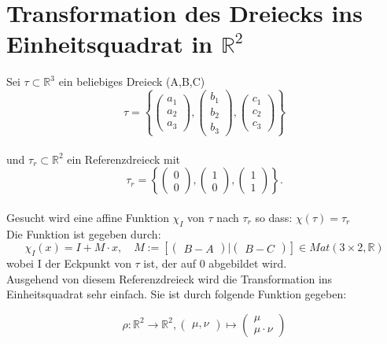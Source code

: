 \documentclass[12pt]{article}
\begin{document}
\section{Transformation des Dreiecks ins \\ Einheitsquadrat in $\mathbb{R}^2$}
Sei $\tau\subset \mathbb{R}^3$ ein beliebiges Dreieck (A,B,C)
\[
\tau = \left \{
\begin{pmatrix} a_1\\ a_2 \\ a_3 \end{pmatrix}
,
\begin{pmatrix} b_1\\ b_2 \\ b_3 \end{pmatrix}
,
\begin{pmatrix} c_1\\ c_2 \\ c_3 \end{pmatrix}
\right \}
\]
\\
und $\tau_r \subset \mathbb{R}^2$ ein Referenzdreieck mit
\[
 \tau_r = \left \{
\begin{pmatrix} 0\\ 0 \end{pmatrix}
,
\begin{pmatrix} 1\\ 0\end{pmatrix}
,
\begin{pmatrix} 1\\ 1\end{pmatrix}
\right \} .
\]
\\
Gesucht wird eine affine Funktion $\chi_I$ von $\tau$ nach $\tau_r$ so dass: $\chi(\tau) = \tau_r$
\\
Die Funktion ist gegeben durch:
\[
\chi_I(x) = I + M\cdot x, \quad M := \left[
\begin{pmatrix} B-A \end{pmatrix}
|
\begin{pmatrix} B-C \end{pmatrix}
\right]
 \in Mat(3\times 2,\mathbb{R})
\]
wobei I der Eckpunkt von $\tau$ ist, der auf 0 abgebildet wird.
\\
Ausgehend von diesem Referenzdreieck wird die Transformation ins Einheitsquadrat sehr einfach. Sie ist durch folgende Funktion gegeben:

\[
	\rho : \mathbb{R}^2 \rightarrow \mathbb{R}^2, \begin{pmatrix} \mu,\nu \end{pmatrix} \mapsto \begin{pmatrix} \mu\\\mu\cdot\nu \end{pmatrix}
\]
\\
\end{document}
